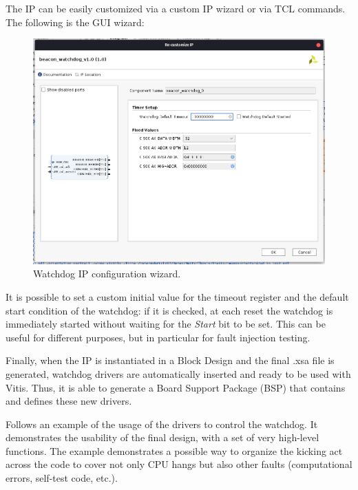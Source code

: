The IP can be easily customized via a custom IP wizard or via TCL commands. The following is the GUI wizard:

\begin{figure}[H]
\centering
\includegraphics[width=0.8\linewidth]{images/chapter4/wizard_ip.png}
\caption{Watchdog IP configuration wizard.}
\label{fig:wd_ip_wizard}
\end{figure}

It is possible to set a custom initial value for the timeout register and the default start condition of the watchdog: if it is checked, at each reset the watchdog is immediately started without waiting for the \textit{Start} bit to be set. This can be useful for different purposes, but in particular for fault injection testing.\bigskip

Finally, when the IP is instantiated in a Block Design and the final .xsa file is generated, watchdog drivers are automatically inserted and ready to be used with Vitis. Thus, it is able to generate a Board Support Package (BSP) that contains and defines these new drivers.\bigskip

Follows an example of the usage of the drivers to control the watchdog. It demonstrates the usability of the final design, with a set of very high-level functions. The example demonstrates a possible way to organize the kicking act across the code to cover not only CPU hangs but also other faults (computational errors, self-test code, etc.).

